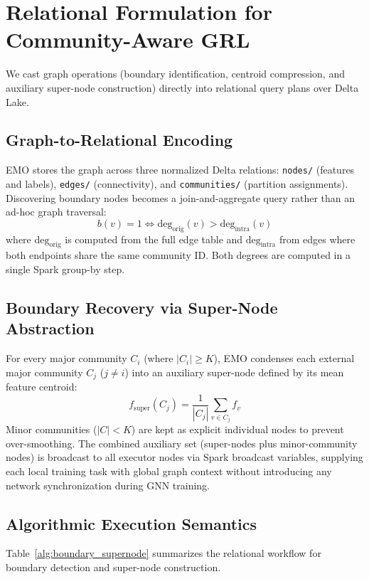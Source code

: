 \documentclass[conference,compsoc]{IEEEtran}
\begin{document}
\section{Relational Formulation for Community-Aware GRL}
\label{sec:relational_formulation}

We cast graph operations (boundary identification, centroid compression, and auxiliary super-node construction) directly into relational query plans over Delta Lake.

\subsection{Graph-to-Relational Encoding}
EMO stores the graph across three normalized Delta relations: \texttt{nodes/} (features and labels), \texttt{edges/} (connectivity), and \texttt{communities/} (partition assignments). Discovering boundary nodes becomes a join-and-aggregate query rather than an ad-hoc graph traversal:
\begin{equation}
b(v) = 1 \iff \text{deg}_{\text{orig}}(v) > \text{deg}_{\text{intra}}(v)
\end{equation}
where $\text{deg}_{\text{orig}}$ is computed from the full edge table and $\text{deg}_{\text{intra}}$ from edges where both endpoints share the same community ID. Both degrees are computed in a single Spark group-by step.

\subsection{Boundary Recovery via Super-Node Abstraction}
For every major community $C_i$ (where $|C_i| \ge K$), EMO condenses each external major community $C_j$ ($j\neq i$) into an auxiliary super-node defined by its mean feature centroid:
\begin{equation}
f_{\text{super}}(C_j) = \frac{1}{|C_j|} \sum_{v \in C_j} f_v
\end{equation}
Minor communities ($|C|<K$) are kept as explicit individual nodes to prevent over-smoothing. The combined auxiliary set (super-nodes plus minor-community nodes) is broadcast to all executor nodes via Spark broadcast variables, supplying each local training task with global graph context without introducing any network synchronization during GNN training.

\subsection{Algorithmic Execution Semantics}
Table~\ref{alg:boundary_supernode} summarizes the relational workflow for boundary detection and super-node construction.
\end{document}
